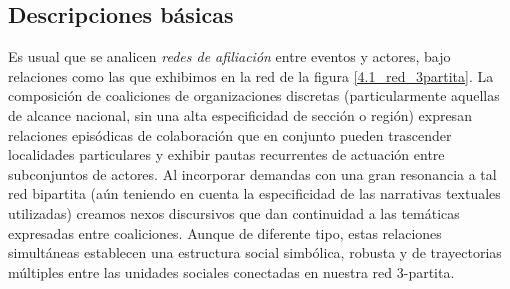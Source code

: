 \documentclass[letterpaper, 11pt]{book}
\theoremstyle{definition}
\theoremstyle{remark}
\begin{document}
\subsection{Descripciones básicas}
\label{subsec:Descripcion}

Es usual que se analicen \emph{redes de afiliación} entre eventos y actores, bajo relaciones como las que exhibimos en la red de la figura \ref{4.1_red_3partita}. 
La composición de coaliciones de organizaciones discretas (particularmente aquellas de alcance nacional, sin una alta especificidad de sección o región) expresan relaciones episódicas de colaboración que en conjunto pueden trascender localidades particulares y exhibir pautas recurrentes de actuación entre subconjuntos de actores. 
Al incorporar demandas con una gran resonancia a tal red bipartita (aún teniendo en cuenta la especificidad de las narrativas textuales utilizadas) creamos nexos discursivos que dan continuidad a las temáticas expresadas entre coaliciones. 
Aunque de diferente tipo, estas relaciones simultáneas establecen una estructura social simbólica, robusta y de trayectorias múltiples entre las unidades sociales conectadas en nuestra red 3-partita. 
\end{document}
